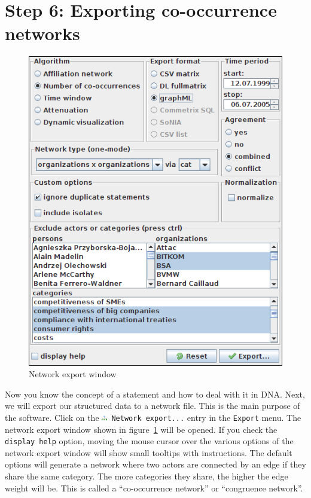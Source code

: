 \documentclass[12pt,a4paper]{scrreprt}
\newcommand{\dnashort}{\textsc{DNA}}
\newcommand{\code}[1]{\texttt{#1}}
\begin{document}
\section*{Step 6: Exporting co-occurrence networks}
\begin{figure}
 \centering
 \includegraphics[scale=0.4]{dna-export.png}
\caption{Network export window}
\label{networkexport}
\end{figure}
Now you know the concept of a statement and how to deal with it in \dnashort. Next, we will export our structured data to a network file. This is the main purpose of the software. Click on the \code{\includegraphics[height=9px]{icons-network.png} Network export...} entry in the \code{Export} menu. The network export window shown in figure~\ref{networkexport} will be opened. If you check the \code{display help} option, moving the mouse cursor over the various options of the network export window will show small tooltips with instructions. The default options will generate a network where two actors are connected by an edge if they share the same category. The more categories they share, the higher the edge weight will be. This is called a ``co-occurrence network'' or ``congruence network''.
\end{document}
